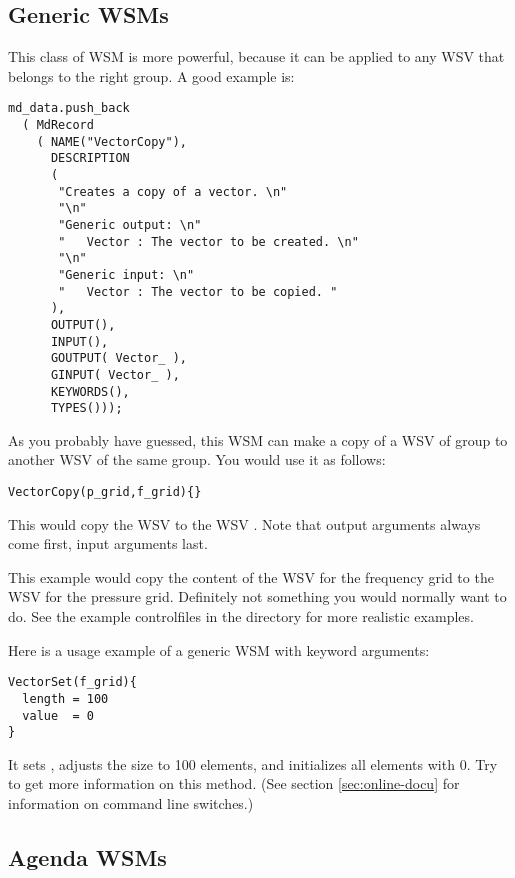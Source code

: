 \subsection{Generic WSMs}

This class of WSM is more powerful, because it can be applied to any
WSV that belongs to the right group. A good example is:

{\small
\begin{verbatim}
md_data.push_back
  ( MdRecord
    ( NAME("VectorCopy"),
      DESCRIPTION
      (
       "Creates a copy of a vector. \n"
       "\n"
       "Generic output: \n"
       "   Vector : The vector to be created. \n"
       "\n"
       "Generic input: \n"
       "   Vector : The vector to be copied. "
      ),
      OUTPUT(),
      INPUT(),
      GOUTPUT( Vector_ ),
      GINPUT( Vector_ ),
      KEYWORDS(),
      TYPES()));
\end{verbatim}
}

\noindent
As you probably have guessed, this WSM can make a copy of a WSV of
group  to another WSV of the same group. You would
use it as follows: 

{\small
\begin{verbatim}
VectorCopy(p_grid,f_grid){} 
\end{verbatim}
}

\noindent
This would copy the WSV  to the WSV
.  Note that output arguments always come first,
input arguments last.

This example would copy the content of the WSV for the frequency grid
to the WSV for the pressure grid. Definitely not something you would
normally want to do. See the example controlfiles in the
 directory for more realistic examples. 

Here is a usage example of a generic WSM with keyword arguments:

{\small
\begin{verbatim}
VectorSet(f_grid){
  length = 100
  value  = 0
}
\end{verbatim}
}

\noindent
It sets , adjusts the size to 100 elements, and
initializes all elements with 0. Try  to
get more information on this method. (See section
\ref{sec:online-docu} for information on command line switches.)

\subsection{Agenda WSMs}

